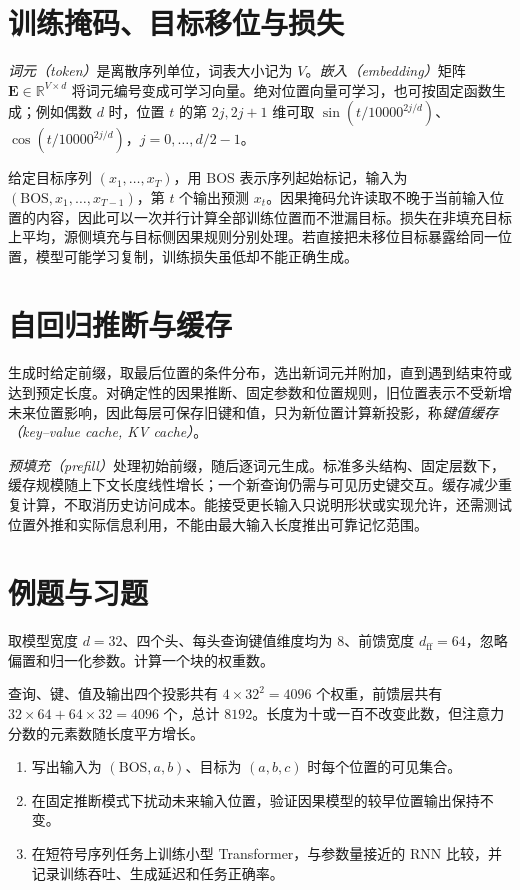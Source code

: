 \section{训练掩码、目标移位与损失}
\emph{词元（token）}是离散序列单位，词表大小记为 $V$。\emph{嵌入（embedding）}矩阵 $\mathbf E\in\mathbb R^{V\times d}$ 将词元编号变成可学习向量。绝对位置向量可学习，也可按固定函数生成；例如偶数 $d$ 时，位置 $t$ 的第 $2j,2j+1$ 维可取 $\sin(t/10000^{2j/d})$、$\cos(t/10000^{2j/d})$，$j=0,\ldots,d/2-1$。

给定目标序列 $(x_1,\ldots,x_T)$，用 $\mathrm{BOS}$ 表示序列起始标记，输入为 $(\mathrm{BOS},x_1,\ldots,x_{T-1})$，第 $t$ 个输出预测 $x_t$。因果掩码允许读取不晚于当前输入位置的内容，因此可以一次并行计算全部训练位置而不泄漏目标。损失在非填充目标上平均，源侧填充与目标侧因果规则分别处理。若直接把未移位目标暴露给同一位置，模型可能学习复制，训练损失虽低却不能正确生成。

\section{自回归推断与缓存}
生成时给定前缀，取最后位置的条件分布，选出新词元并附加，直到遇到结束符或达到预定长度。对确定性的因果推断、固定参数和位置规则，旧位置表示不受新增未来位置影响，因此每层可保存旧键和值，只为新位置计算新投影，称\emph{键值缓存（key--value cache, KV cache）}。

\emph{预填充（prefill）}处理初始前缀，随后逐词元生成。标准多头结构、固定层数下，缓存规模随上下文长度线性增长；一个新查询仍需与可见历史键交互。缓存减少重复计算，不取消历史访问成本。能接受更长输入只说明形状或实现允许，还需测试位置外推和实际信息利用，不能由最大输入长度推出可靠记忆范围。

\section{例题与习题}
\begin{example}[一个小块的权重数]
取模型宽度 $d=32$、四个头、每头查询键值维度均为 $8$、前馈宽度 $d_{\mathrm{ff}}=64$，忽略偏置和归一化参数。计算一个块的权重数。
\end{example}
\begin{solve}
查询、键、值及输出四个投影共有 $4\times32^2=4096$ 个权重，前馈层共有 $32\times64+64\times32=4096$ 个，总计 $8192$。长度为十或一百不改变此数，但注意力分数的元素数随长度平方增长。
\end{solve}
\begin{enumerate}
\item 写出输入为 $(\mathrm{BOS},a,b)$、目标为 $(a,b,c)$ 时每个位置的可见集合。
\item 在固定推断模式下扰动未来输入位置，验证因果模型的较早位置输出保持不变。
\item 在短符号序列任务上训练小型 Transformer，与参数量接近的 RNN 比较，并记录训练吞吐、生成延迟和任务正确率。
\end{enumerate}

